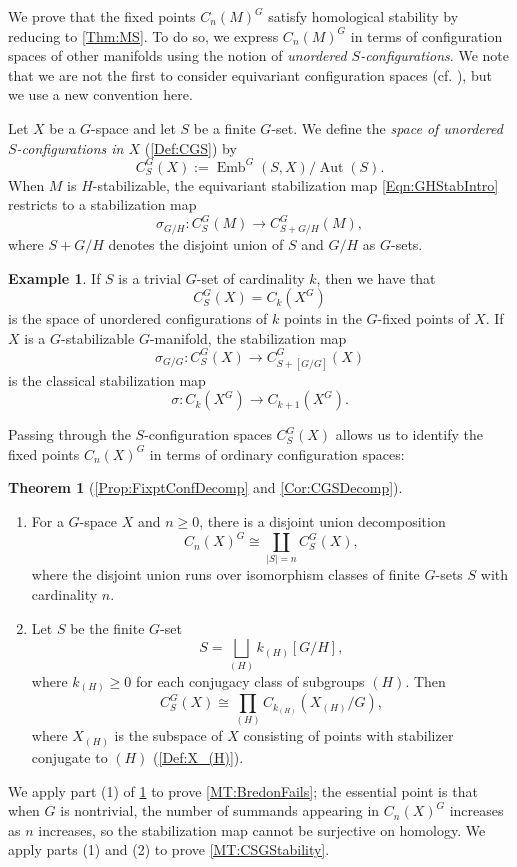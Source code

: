 \documentclass[11pt]{amsart}
\theoremstyle{definition}
\newtheorem{example}[equation]{Example}
\numberwithin{equation}{subsection} %
\newtheorem{thmx}{Theorem}
\newcommand{\Aut}{\operatorname{Aut}}
\def\Emb{\operatorname{Emb}}
\begin{document}
We prove that the fixed points $C_n(M)^G$ satisfy homological stability by reducing to \cref{Thm:MS}. To do so, we express $C_n(M)^G$ in terms of configuration spaces of other manifolds using the notion of \emph{unordered $S$-configurations}. We note that we are not the first to consider equivariant configuration spaces (cf. \cite{RS00}), but we use a new convention here.

Let $X$ be a $G$-space and let $S$ be a finite $G$-set. We define the \emph{space of unordered $S$-configurations in $X$} (\cref{Def:CGS}) by
$$C_S^G(X) := \Emb^G(S,X)/\Aut(S).$$
When $M$ is $H$-stabilizable, the equivariant stabilization map \eqref{Eqn:GHStabIntro} restricts to a stabilization map 
$$\sigma_{G/H} : C_S^G(M) \to C_{S + G/H}^G(M),$$
where $S + G/H$ denotes the disjoint union of $S$ and $G/H$ as $G$-sets.

\begin{example}
If $S$ is a trivial $G$-set of cardinality $k$, then we have that
$$C_{S}^G(X) = C_k(X^G)$$
is the space of unordered configurations of $k$ points in the $G$-fixed points of $X$. If $X$ is a $G$-stabilizable $G$-manifold, the stabilization map
$$\sigma_{G/G} : C_{S}^G(X) \to C_{S + [G/G]}^G(X)$$
is the classical stabilization map
$$\sigma: C_k(X^G) \to C_{k+1}(X^G).$$
\end{example}

Passing through the $S$-configuration spaces $C_S^G(X)$ allows us to identify the fixed points $C_n(X)^G$ in terms of ordinary configuration spaces:

\begin{thmx}[{\cref{Prop:FixptConfDecomp} and \cref{Cor:CGSDecomp}}]\label{MT:CtoCSG}
\
\begin{enumerate}
\item For a $G$-space $X$ and $n\geq 0$, there is a disjoint union decomposition
$$ C_n(X)^G \cong \coprod_{|S|=n} C^G_S(X), $$
where the disjoint union runs over isomorphism classes of finite $G$-sets $S$ with cardinality $n$.

\item Let $S$ be the finite $G$-set
$$S = \bigsqcup_{(H)} k_{(H)}[G/H],$$
where $k_{(H)} \geq 0$ for each conjugacy class of subgroups $(H)$. Then
$$C_S^G(X) \cong \prod_{(H)} C_{k_{(H)}}(X_{(H)}/G),$$
where $X_{(H)}$ is the subspace of $X$ consisting of points with stabilizer conjugate to $(H)$ (\cref{Def:X_(H)}). 
\end{enumerate}
\end{thmx}

We apply part (1) of \cref{MT:CtoCSG} to prove \cref{MT:BredonFails}; the essential point is that when $G$ is nontrivial, the number of summands appearing in $C_n(X)^G$ increases as $n$ increases, so the stabilization map cannot be surjective on homology. We apply parts (1) and (2) to prove \cref{MT:CSGStability}.
\end{document}
